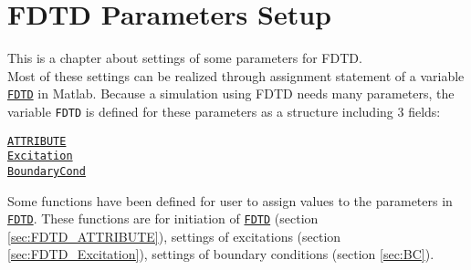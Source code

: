 \chapter{FDTD Parameters Setup}\label{chap:FDTD Parameter Setup}
This is a chapter about  settings of  some parameters for FDTD.\\
Most of these settings can be realized through  assignment statement of a variable \hyperref[para:FDTD]{\texttt{FDTD}} in Matlab.  Because a simulation using FDTD needs many parameters, the variable \texttt{FDTD} is defined for these parameters as a structure including 3 fields:  \label{para:FDTD} %
       \begin{myindentpar}
	      \hyperref[para:FDTD_ATTRIBUTE]{\texttt{ATTRIBUTE}} \\ 
	      \hyperref[para:Excitation]{\texttt{Excitation}}  \\ 
	      \hyperref[para:BoundaryCond]{\texttt{BoundaryCond}}
       \end{myindentpar}
Some functions have been defined for user to  assign values to the parameters in \hyperref[para:FDTD]{\texttt{FDTD}}. These functions are for initiation of \hyperref[para:FDTD]{\texttt{FDTD}} (section \ref{sec:FDTD_ATTRIBUTE}), settings of  excitations (section \ref{sec:FDTD_Excitation}), settings of boundary conditions (section \ref{sec:BC}).

 

